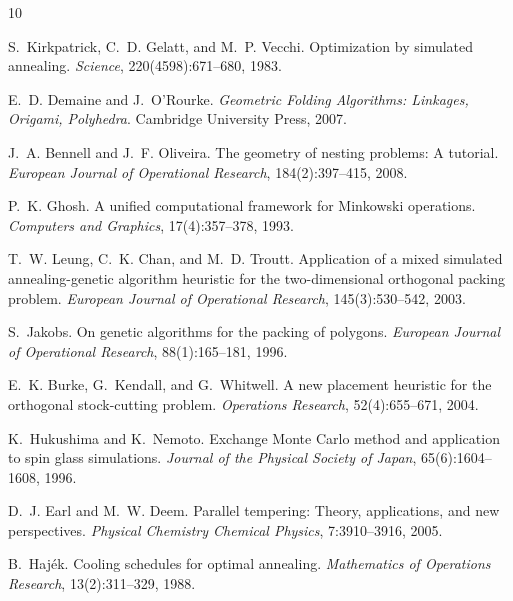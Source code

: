 \documentclass[10pt,twocolumn]{article}
\begin{document}

\begin{thebibliography}{10}

S.~Kirkpatrick, C.~D. Gelatt, and M.~P. Vecchi.
Optimization by simulated annealing.
\textit{Science}, 220(4598):671--680, 1983.

E.~D. Demaine and J.~O'Rourke.
\textit{Geometric Folding Algorithms: Linkages, Origami, Polyhedra}.
Cambridge University Press, 2007.

J.~A. Bennell and J.~F. Oliveira.
The geometry of nesting problems: A tutorial.
\textit{European Journal of Operational Research}, 184(2):397--415, 2008.

P.~K. Ghosh.
A unified computational framework for Minkowski operations.
\textit{Computers and Graphics}, 17(4):357--378, 1993.

T.~W. Leung, C.~K. Chan, and M.~D. Troutt.
Application of a mixed simulated annealing-genetic algorithm heuristic
for the two-dimensional orthogonal packing problem.
\textit{European Journal of Operational Research}, 145(3):530--542, 2003.

S.~Jakobs.
On genetic algorithms for the packing of polygons.
\textit{European Journal of Operational Research}, 88(1):165--181, 1996.

E.~K. Burke, G.~Kendall, and G.~Whitwell.
A new placement heuristic for the orthogonal stock-cutting problem.
\textit{Operations Research}, 52(4):655--671, 2004.

K.~Hukushima and K.~Nemoto.
Exchange Monte Carlo method and application to spin glass simulations.
\textit{Journal of the Physical Society of Japan}, 65(6):1604--1608, 1996.

D.~J. Earl and M.~W. Deem.
Parallel tempering: Theory, applications, and new perspectives.
\textit{Physical Chemistry Chemical Physics}, 7:3910--3916, 2005.

B.~Haj\'ek.
Cooling schedules for optimal annealing.
\textit{Mathematics of Operations Research}, 13(2):311--329, 1988.

\end{thebibliography}
\end{document}
